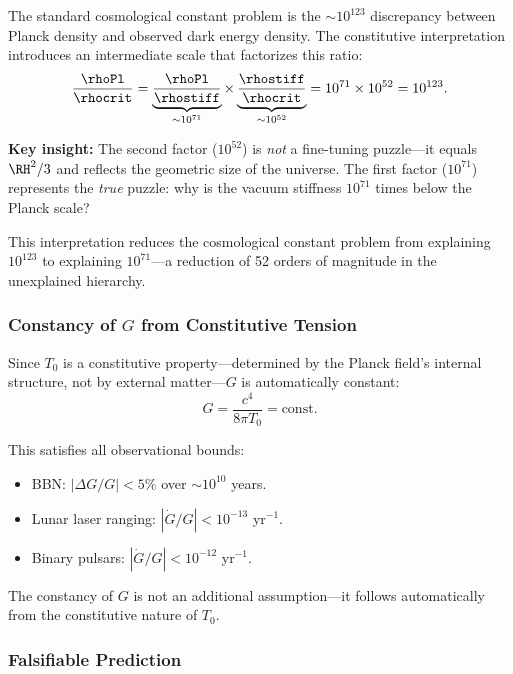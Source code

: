 The standard cosmological constant problem is the $\sim 10^{123}$ discrepancy between Planck density and observed dark energy density. The constitutive interpretation introduces an intermediate scale that factorizes this ratio:
\begin{equation}
\label{eq:CC_factorization}
\frac{\rhoPl}{\rhocrit} = \underbrace{\frac{\rhoPl}{\rhostiff}}_{\sim 10^{71}} \times \underbrace{\frac{\rhostiff}{\rhocrit}}_{\sim 10^{52}} = 10^{71} \times 10^{52} = 10^{123}.
\end{equation}

\textbf{Key insight:} The second factor ($10^{52}$) is \emph{not} a fine-tuning puzzle---it equals $\RH^2/3$ and reflects the geometric size of the universe. The first factor ($10^{71}$) represents the \emph{true} puzzle: why is the vacuum stiffness $10^{71}$ times below the Planck scale?

This interpretation reduces the cosmological constant problem from explaining $10^{123}$ to explaining $10^{71}$---a reduction of 52 orders of magnitude in the unexplained hierarchy.

\subsubsection{Constancy of $G$ from Constitutive Tension}
\label{sec:G_constancy}

Since $T_0$ is a constitutive property---determined by the Planck field's internal structure, not by external matter---$G$ is automatically constant:
\begin{equation}
G = \frac{c^4}{8\pi T_0} = \text{const}.
\end{equation}

This satisfies all observational bounds:
\begin{itemize}
    \item BBN: $|\Delta G/G| < 5\%$ over $\sim 10^{10}$ years.
    \item Lunar laser ranging: $|\dot{G}/G| < 10^{-13}$ yr$^{-1}$.
    \item Binary pulsars: $|\dot{G}/G| < 10^{-12}$ yr$^{-1}$.
\end{itemize}

The constancy of $G$ is not an additional assumption---it follows automatically from the constitutive nature of $T_0$.

\subsubsection{Falsifiable Prediction}
\label{sec:falsifiable_tension}

